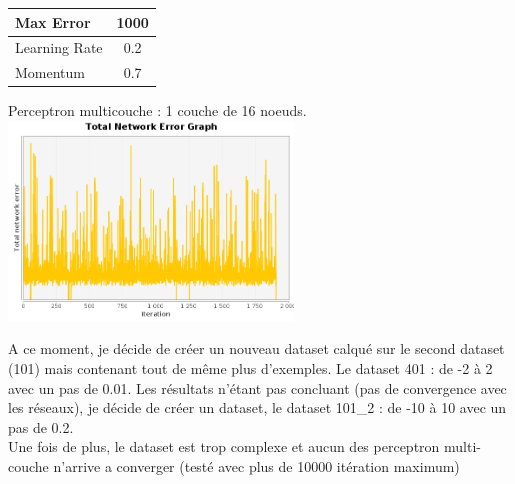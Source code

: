 \documentclass[10pt]{report}
\begin{document}
\begin{center}

\begin{tabular}{|l|c|}
	\hline
	Max Error & 1000 \\
	\hline
	Learning Rate & 0.2 \\
	\hline
	Momentum & 0.7 \\
	\hline
\end{tabular}

Perceptron multicouche : 1 couche de 16 noeuds.\\
\includegraphics[height=200px]{img/SQUARE_16_704.png}\\
\end{center}

A ce moment, je décide de créer un nouveau dataset calqué sur le second dataset (101) mais contenant tout de même plus d'exemples.
Le dataset 401 : de -2 à 2 avec un pas de 0.01.
Les résultats n'étant pas concluant (pas de convergence avec les réseaux), je décide de créer un dataset, le dataset 101\_2 : de -10 à 10 avec un pas de 0.2.\\
Une fois de plus, le dataset est trop complexe et aucun des perceptron multi-couche n'arrive a converger (testé avec plus de 10000 itération maximum)
\end{document}
